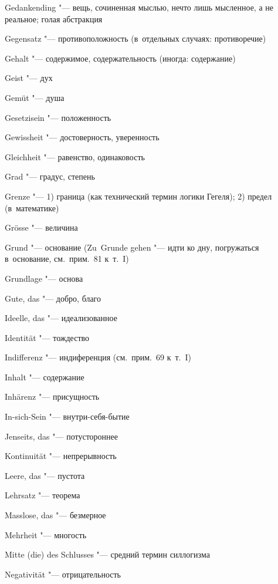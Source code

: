 \begin{multicols}{2}
\bigskip

Gedank\-ending "--- вещь, сочиненная мыслью, нечто лишь мысленное,
а не реальное; голая абстракция

Gegen\-satz "--- противоположность (в~отдельных случаях:
противоречие)

Gehalt "--- содержимое, содержательность (иногда: содержание)

Geist "--- дух

Gemüt "--- душа

Gesetzi\-sein "--- положенность

Gewiss\-heit "--- достоверность, уверенность

Gleich\-heit "--- равенство, одинаковость

Grad "--- градус, степень

Grenze "--- 1) граница (как технический термин логики Гегеля); 2) предел
(в~математике)

Grösse "--- величина

Grund "--- основание (Zu~Grunde gehen "--- идти ко дну,
погружаться в~основание, см.~прим.~81 к~т.~I)

Grundlage "--- основа

Gute, das "--- добро, благо

\bigskip

Ideelle, das "--- идеализованное

Identität "--- тождество

Indiffe\-renz "--- индиференция (см.~прим.~69 к~т.~I)

Inhalt "--- содержание

Inhärenz "--- присущность

In-sich-Sein "--- внутри-себя-бытие

\bigskip

Jenseits, das "--- потустороннее

\bigskip

Kontinui\-tät "--- непрерывность

\bigskip

Leere, das "--- пустота

Lehrsatz "--- теорема

\bigskip

Masslose, das "--- безмерное

Mehrheit "--- многость

Mitte (die) des Schlusses "--- средний термин силлогизма

\bigskip

Nega\-tivi\-tät "--- отрицательность


\end{multicols}

